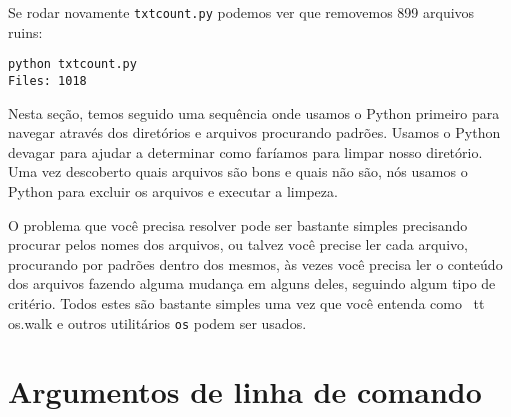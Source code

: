 Se rodar novamente {\tt txtcount.py} podemos ver que removemos 899 arquivos ruins:

\beforeverb
\begin{verbatim}
python txtcount.py 
Files: 1018
\end{verbatim}
\afterverb

Nesta seção, temos seguido uma sequência onde usamos o Python primeiro para navegar através dos diretórios e arquivos
procurando padrões. Usamos o Python devagar para ajudar a determinar como faríamos para limpar nosso diretório.
Uma vez descoberto quais arquivos são bons e quais não são, nós usamos o Python para excluir os arquivos e executar a limpeza.

O problema que você precisa resolver pode ser bastante simples 
precisando procurar pelos nomes dos arquivos,
ou talvez você precise ler cada arquivo, procurando por padrões dentro dos mesmos, às vezes 
você precisa ler o conteúdo dos arquivos fazendo alguma mudança em alguns deles, seguindo algum 
tipo de critério. Todos estes são bastante simples uma vez que você entenda como {\ tt os.walk}
e outros utilitários {\tt os} podem ser usados.

\section{Argumentos de linha de comando}

